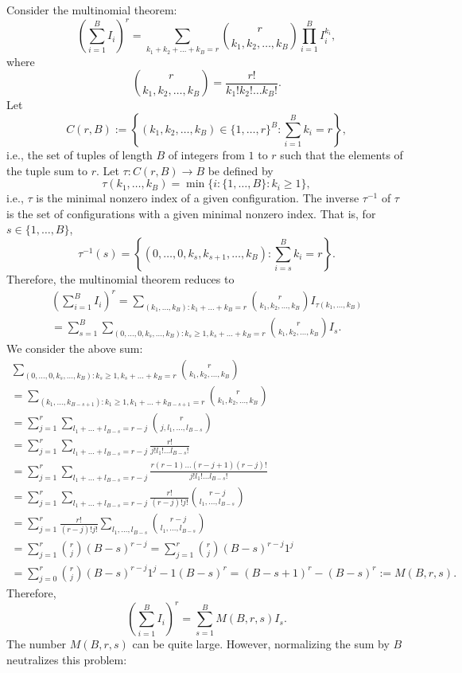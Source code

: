 \documentclass[12pt]{article}
\begin{document}
Consider the multinomial theorem: 
$$ \left( \sum_{i=1}^B I_i \right)^r = \sum_{k_1 + k_2 + \dots + k_B = r} \binom{ r }{ k_1, k_2, \dots, k_B } \prod_{i=1}^B I_{i}^{k_i},$$ where $$ \binom{r}{k_1, k_2, \dots, k_B} = \frac{r!}{k_1! k_2! \dots k_B!}.$$
Let $$ C(r, B) := \left\{(k_1, k_2, \dots, k_B) \in \{1, \dots, r\}^B : \sum_{i=1}^B k_i = r\right\},$$ i.e., the set of tuples of length $B$ of integers from $1$ to $r$ such that the elements of the  tuple sum to $r$. Let $\tau: C(r,B) \to B$ be defined by
$$\tau(k_1, \dots, k_B) = \min\{i : \{1, \dots, B\} : k_i \geq 1 \},$$ i.e., $\tau$ is the minimal nonzero index of a given configuration. The inverse $\tau^{-1}$ of $\tau$ is the set of configurations with a given minimal nonzero index. That is, for $s \in \{1, \dots, B\}$,
$$ \tau^{-1}(s) = \left\{ (0, \dots, 0, k_s, k_{s+1}, \dots, k_B) : \sum_{i=s}^B k_i = r \right\} .$$
Therefore, the multinomial theorem reduces to
\begin{multline*}
\left( \sum_{i=1}^B I_i \right)^r = \sum_{(k_1, \dots, k_B) : k_1 + \dots + k_B = r} \binom{r}{k_1, k_2, \dots, k_B} I_{\tau(k_1, \dots, k_B)} \\ = \sum_{s=1}^B \sum_{( 0, \dots, 0, k_s, \dots, k_B): k_s \geq 1, k_s + \dots + k_B = r} \binom{r}{k_1, k_2, \dots, k_B} I_s.
\end{multline*}
We consider the above sum:
\begin{multline*}
\sum_{( 0, \dots, 0, k_s, \dots, k_B): k_s \geq 1, k_s + \dots + k_B = r} \binom{r}{k_1, k_2, \dots, k_B} \\ = \sum_{(k_1, \dots, k_{B - s + 1}) : k_1 \geq 1, k_1 + \dots + k_{B - s + 1} = r} \binom{r}{k_1, k_2, \dots, k_B} \\ = \sum_{j=1}^r \sum_{l_1 + \dots + l_{B - s} = r - j} \binom{r}{ j, l_1, \dots, l_{B-s}} \\ = \sum_{j=1}^r \sum_{ l_1 + \dots + l_{B-s} = r-j } \frac{ r! }{ j! l_1! \dots l_{B-s}!} \\ = \sum_{j=1}^r \sum_{l_1 + \dots + l_{B-s} = r-j} \frac{r(r-1)\dots(r-j+1)(r-j)!}{ j! l_1! \dots l_{B-s}!}  \\ = \sum_{j=1}^r \sum_{l_1 + \dots + l_{B-s} = r - j} \frac{r!}{(r-j)!j!} \binom{r-j}{l_1, \dots, l_{B-s}} \\ = \sum_{j=1}^r \frac{r!}{(r-j)!j!} \sum_{l_1, \dots, l_{B-s}} \binom{r-j}{l_1, \dots, l_{B-s}} \\ = \sum_{j=1}^r \binom{r}{j} (B-s)^{r-j}  = \sum_{j=1}^r \binom{r}{j} (B-s)^{r-j} 1^j \\ = \sum_{j=0}^r \binom{r}{j} (B-s)^{r-j}1^j  - 1(B-s)^r = (B - s + 1)^r - (B-s)^r := M(B,r,s).
\end{multline*}
Therefore,
$$\left( \sum_{i=1}^B I_i \right)^r = \sum_{s=1}^B M(B,r,s)I_s.$$ The number $M(B,r,s)$ can be quite large. However, normalizing the sum by $B$ neutralizes this problem:
\end{document}
